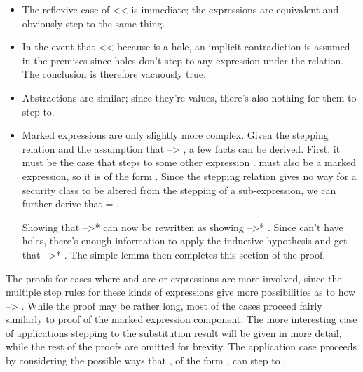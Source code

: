 \documentclass[12pt]{report}
\begin{document}
\begin{itemize}

\item  The reflexive case of  <<  is
    immediate; the expressions are equivalent and obviously step to
        the same thing.



\item  In the event that  <<  because
     is a hole, an implicit contradiction is assumed in
        the premises since holes don't step to any expression under
        the  relation. The conclusion is therefore
        vacuously true.



\item  Abstractions are similar; since they're values, there's also
    nothing for them to step to.



\item  Marked expressions are only slightly more complex. Given the
    stepping relation and the assumption that 
          --> , a few
        facts can be derived. First, it must be the case that
         steps to some other expression
        .  must also be a marked
        expression, so it is of the form 
         . Since the stepping
        relation gives no way for a security class to be altered from
        the stepping of a sub-expression, we can further derive that
         = .


      Showing that  -->*  can now be
        rewritten as showing  
         -->*  
        . Since  can't have holes,
        there's enough information to apply the inductive hypothesis
        and get that  -->* . The
        simple lemma  then
        completes this section of the proof.

\end{itemize}


The proofs for cases where  and  are
 or  expressions are more involved,
since the multiple step rules for these kinds of expressions give
more possibilities as to how  --> . While
the proof may be rather long, most of the cases proceed fairly
similarly to proof of the marked expression component. The more
interesting case of applications stepping to the substitution result
will be given in more detail, while the rest of the proofs are
omitted for brevity. The application case proceeds by considering the
possible ways that , of the form 
 , can step to .
\end{document}
